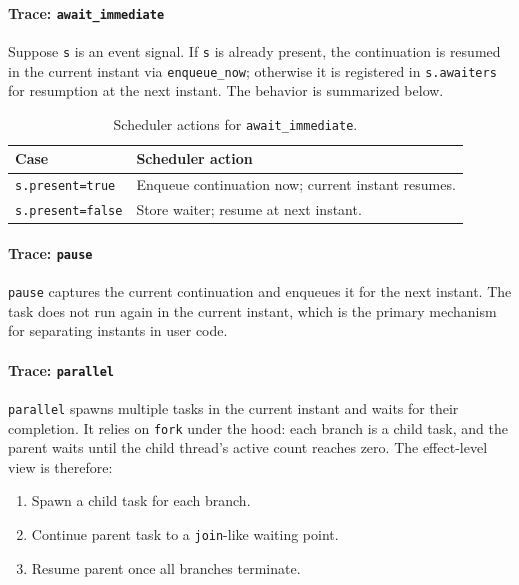 \paragraph{Trace: \texttt{await\_immediate}}
Suppose \texttt{s} is an event signal. If \texttt{s} is already present, the
continuation is resumed in the current instant via \texttt{enqueue\_now};
otherwise it is registered in \texttt{s.awaiters} for resumption at the next
instant. The behavior is summarized below.
\begin{table}[h]
\centering
\begin{tabularx}{\linewidth}{lY}
\hline
Case & Scheduler action \\ \hline
\texttt{s.present=true} & Enqueue continuation now; current instant resumes. \\
\texttt{s.present=false} & Store waiter; resume at next instant. \\ \hline
\end{tabularx}
\caption{Scheduler actions for \texttt{await\_immediate}.}
\end{table}

\paragraph{Trace: \texttt{pause}}
\texttt{pause} captures the current continuation and enqueues it for the next
instant. The task does not run again in the current instant, which is the
primary mechanism for separating instants in user code.

\paragraph{Trace: \texttt{parallel}}
\texttt{parallel} spawns multiple tasks in the current instant and waits for
their completion. It relies on \texttt{fork} under the hood: each branch is a
child task, and the parent waits until the child thread's active count reaches
zero. The effect-level view is therefore:
\begin{enumerate}
\item Spawn a child task for each branch.
\item Continue parent task to a \texttt{join}-like waiting point.
\item Resume parent once all branches terminate.
\end{enumerate}

